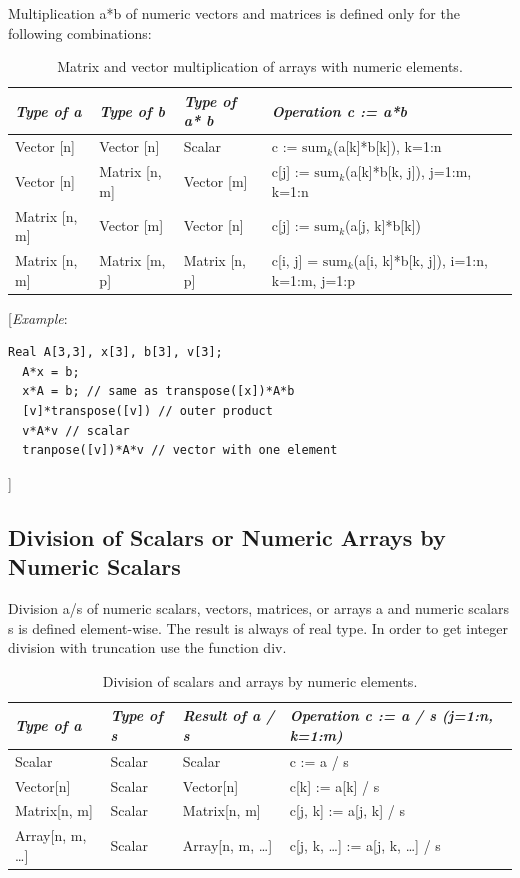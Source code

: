 \documentclass[10pt,a4paper]{report}
\def\doublelabel#1{\label{#1}}
\begin{document}
Multiplication a*b of numeric vectors and matrices is defined only for
the following combinations:


\begin{longtable}[]{|l|l|l|l|}
\caption{Matrix and vector multiplication of arrays with numeric elements.}\\
\hline
\emph{Type of a} & \emph{Type of b} & \emph{Type of a* b} &
\emph{Operation c := a*b}\\ \hline
\endhead
Vector {[}n{]} & Vector {[}n{]} & Scalar & c :=
$\textrm{sum}_k$(a{[}k{]}*b{[}k{]}), k=1:n\\ \hline
Vector {[}n{]} & Matrix {[}n, m{]} & Vector {[}m{]} & c{[}j{]} :=
$\textrm{sum}_k$(a{[}k{]}*b{[}k, j{]}), j=1:m, k=1:n\\ \hline
Matrix {[}n, m{]} & Vector {[}m{]} & Vector {[}n{]} & c{[}j{]} :=
$\textrm{sum}_k$(a{[}j, k{]}*b{[}k{]})\\ \hline
Matrix {[}n, m{]} & Matrix {[}m, p{]} & Matrix {[}n, p{]} & c{[}i, j{]}
= $\textrm{sum}_k$(a{[}i, k{]}*b{[}k, j{]}), i=1:n, k=1:m,
j=1:p\\ \hline

\end{longtable}

{[}\emph{Example}:

\begin{lstlisting}[language=modelica]
  Real A[3,3], x[3], b[3], v[3];
  A*x = b;
  x*A = b; // same as transpose([x])*A*b
  [v]*transpose([v]) // outer product
  v*A*v // scalar
  tranpose([v])*A*v // vector with one element
\end{lstlisting}
{]}

\subsection{Division of Scalars or Numeric Arrays by Numeric Scalars}\doublelabel{division-of-scalars-or-numeric-arrays-by-numeric-scalars}

Division a/s of numeric scalars, vectors, matrices, or arrays a and
numeric scalars s is defined element-wise. The result is always of real
type. In order to get integer division with truncation use the function
div.

\begin{longtable}[]{|l|l|l|l|}
\caption{Division of scalars and arrays by numeric elements.}\\
\hline \endhead
\emph{Type of a} & \emph{Type of s} & \emph{Result of a / s} &
\emph{Operation c := a / s (j=1:n, k=1:m)}\\ \hline
Scalar & Scalar & Scalar & c := a / s\\ \hline
Vector{[}n{]} & Scalar & Vector{[}n{]} & c{[}k{]} := a{[}k{]} /
s\\ \hline
Matrix{[}n, m{]} & Scalar & Matrix{[}n, m{]} & c{[}j, k{]} := a{[}j,
k{]} / s\\ \hline
Array{[}n, m, \ldots{}{]} & Scalar & Array{[}n, m, \ldots{}{]} & c{[}j,
k, \ldots{}{]} := a{[}j, k, \ldots{}{]} / s\\ \hline

\end{longtable}
\end{document}

